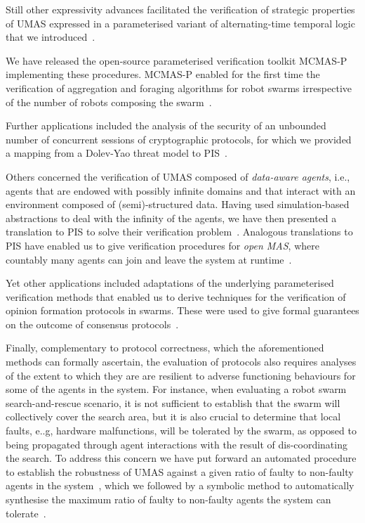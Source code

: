 \documentclass{article}
\newcommand{\mcmasp}{\textsc{MCMAS-P}\xspace}
\begin{document}
Still  other expressivity advances  facilitated the  verification of
strategic properties of UMAS expressed in a parameterised variant  of
alternating-time temporal logic that we introduced~\cite{KouvarosLomuscio16c}.



We have released the open-source parameterised verification toolkit \mcmasp
implementing these procedures.  \mcmasp enabled for the first time
the verification of aggregation and foraging algorithms for robot swarms
irrespective of the number of robots composing the
swarm~\cite{KouvarosLomuscio15b,KouvarosLomuscio16a}.  

Further applications included the analysis of the security of an unbounded
number of concurrent sessions of cryptographic protocols, for which we provided
a mapping from a Dolev-Yao threat model to
PIS~\cite{BoureanuKouvarosLomuscio16}.   

Others concerned  the verification of UMAS composed of {\em data-aware agents},
i.e., agents that are endowed with possibly infinite domains and that interact
with an environment composed of (semi)-structured
data.  Having used simulation-based
abstractions to deal with the infinity of the  agents, we have then presented  a
translation  to PIS to solve their verification
problem~\cite{BelardinelliKouvarosLomuscio17}. 
Analogous translations to PIS have enabled us to give verification procedures
for {\em open MAS},  where countably many agents can join and leave the system
at runtime~\cite{Kouvaros+19}.


Yet other applications included adaptations of the underlying parameterised
verification methods that  enabled us to derive techniques for the verification
of opinion formation protocols in swarms. These were used to give formal
guarantees on the outcome of consensus protocols~\cite{KouvarosLomuscio16b}. 

Finally, complementary to protocol correctness, which the aforementioned
methods can formally ascertain, the evaluation of protocols also requires
analyses of the extent to which they are are resilient to adverse functioning
behaviours for some of the agents in the system.  For instance, when evaluating
a robot swarm search-and-rescue scenario, it is not sufficient to establish
that the swarm will collectively cover the search area, but it is also crucial
to determine that local faults, e..g, hardware malfunctions, will be tolerated
by the swarm, as opposed to being propagated through agent interactions with
the result of  dis-coordinating the search. To address this concern we have put
forward an automated procedure to establish the robustness of UMAS against a
given ratio of faulty to non-faulty agents in the
system~\cite{KouvarosLomuscio17b}, which we followed by a symbolic method to
automatically synthesise the maximum ratio of faulty to non-faulty agents the
system can tolerate~\cite{KouvarosLomuscioPirovano18}.  
\end{document}
